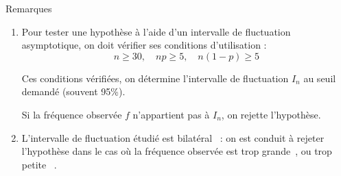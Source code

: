 \begin{spacing}{1.2}
\begin{bclogo}[couleur = gray!30 , arrondi = 0.1 ,logo = \bclampe , barre = snake , tailleOndu = 1.5]{Remarques}
\begin{enumerate}
\item Pour tester une hypothèse à l'aide d'un intervalle de fluctuation asymptotique, on doit vérifier ses conditions d'utilisation :
\[n\geq 30, \quad np\geq 5, \quad n(1-p)\geq 5\]

Ces conditions vérifiées, on détermine l'intervalle de fluctuation $I_n$ au seuil demandé (souvent 95\%).

Si la fréquence observée $f$ n'appartient pas à $I_n$, on rejette l'hypothèse.

\item L'intervalle de fluctuation étudié est \og bilatéral\fg~ : on est conduit à rejeter l'hypothèse dans le cas où la fréquence observée est \og trop grande\fg~, ou \og trop petite \fg~.
\end{enumerate}
\end{bclogo}




\end{spacing}

